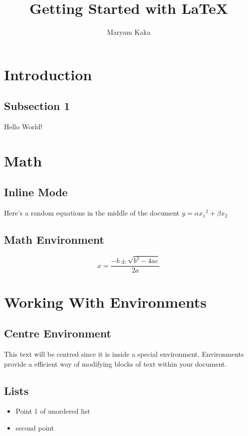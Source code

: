 \documentclass{article}
\begin{document}
\author{Maryam Kaka}
\title{Getting Started with \LaTeX}
\maketitle

\tableofcontents 

\newpage
\section{Introduction}
\subsection{Subsection 1}
Hello World! %

\section{Math}
\subsection{Inline Mode}
Here's a random equations in the middle of the document $y = \alpha{x_1}^2 + \beta{x_2}$

\subsection{Math Environment}
\begin{equation}
x = \frac{-b \pm \sqrt{b^2 - 4ac}}{2a}
\end{equation}

\section{Working With Environments}
\subsection{Centre Environment}
\begin{center}
This text will be centred since it is inside a special 
environment. Environments provide a efficient way of modifying 
blocks of text within your document.
\end{center}

\subsection{Lists} \label{lists}
\begin{itemize}		%
\item Point 1 of unordered list
\item second point
\end{itemize}
\end{document}
